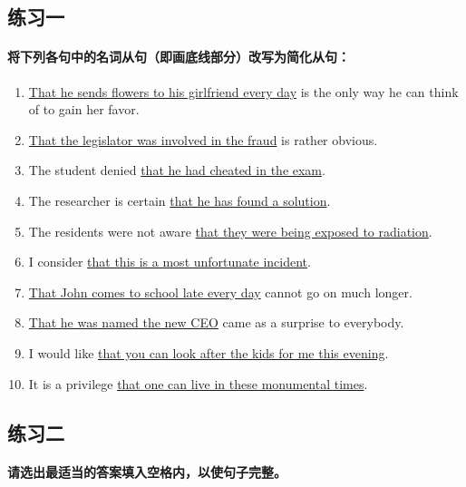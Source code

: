 \subsection{练习一}

\paragraph{将下列各句中的名词从句（即画底线部分）改写为简化从句：}

\begin{enumerate}
\item \ul{That he sends flowers to his girlfriend every day} is the only way he
can think of to gain her favor.

\item \ul{That the legislator was involved in the fraud} is rather obvious.

\item The student denied \ul{that he had cheated in the exam}.

\item The researcher is certain \ul{that he has found a solution}.

\item The residents were not aware \ul{that they were being exposed to
radiation}.

\item I consider \ul{that this is a most unfortunate incident}.

\item \ul{That John comes to school late every day} cannot go on much longer.

\item \ul{That he was named the new CEO} came as a surprise to everybody.

\item I would like \ul{that you can look after the kids for me this evening}.

\item It is a privilege \ul{that one can live in these monumental times}.
\end{enumerate}

\subsection{练习二}

\paragraph{请选出最适当的答案填入空格内，以使句子完整。}

